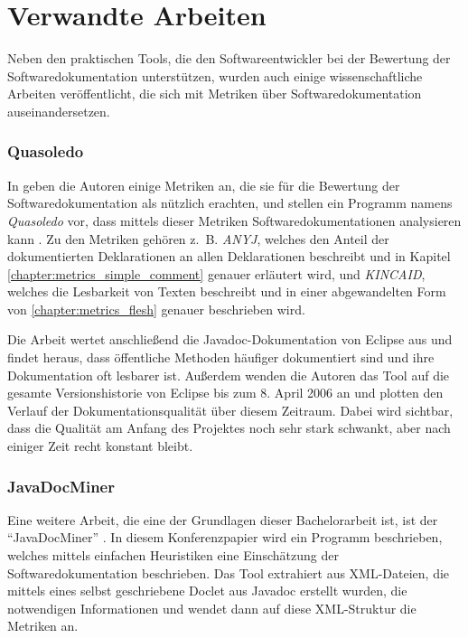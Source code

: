 \section{Verwandte Arbeiten}

Neben den praktischen Tools, die den Softwareentwickler bei der Bewertung der Softwaredokumentation unterstützen, wurden auch einige wissenschaftliche Arbeiten veröffentlicht, die sich mit Metriken über Softwaredokumentation auseinandersetzen. 


\subsubsection{Quasoledo}\label{chapter:Quasoledo}
In \cite[S. 4-10]{HowDocumentationEvolvesoverTime} geben die Autoren einige Metriken an, die sie für die Bewertung der Softwaredokumentation als nützlich erachten, und stellen ein Programm namens \textit{Quasoledo} vor, dass mittels dieser Metriken Softwaredokumentationen analysieren kann . Zu den Metriken gehören z.~B.  \textit{ANYJ},  welches den Anteil der dokumentierten Deklarationen an allen Deklarationen beschreibt und in Kapitel \ref{chapter:metrics_simple_comment} genauer erläutert wird, und \textit{KINCAID}, welches die Lesbarkeit von Texten beschreibt und in einer abgewandelten Form von  \ref{chapter:metrics_flesh} genauer beschrieben wird. 

Die Arbeit wertet anschließend die Javadoc-Dokumentation von Eclipse aus und findet heraus, dass öffentliche Methoden häufiger dokumentiert sind und ihre Dokumentation oft lesbarer ist. Außerdem wenden die Autoren das Tool auf die gesamte Versionshistorie von Eclipse bis zum 8. April 2006 an und plotten den Verlauf der Dokumentationsqualität über diesem Zeitraum. Dabei wird sichtbar, dass die Qualität am Anfang des Projektes noch sehr stark schwankt, aber nach einiger Zeit recht konstant bleibt. 
\subsubsection{JavaDocMiner}
Eine weitere Arbeit, die eine der Grundlagen dieser Bachelorarbeit ist, ist der \enquote{JavaDocMiner} \cite[S. 68-79]{AutomaticQualityAssessmentofSourceCodeComments:TheJavadocMiner}. In diesem Konferenzpapier wird ein Programm beschrieben, welches mittels einfachen Heuristiken eine Einschätzung der Softwaredokumentation beschrieben. Das Tool extrahiert aus XML-Dateien, die mittels eines selbst geschriebene Doclet aus Javadoc erstellt wurden, die notwendigen Informationen und wendet dann auf diese XML-Struktur die Metriken an. 

